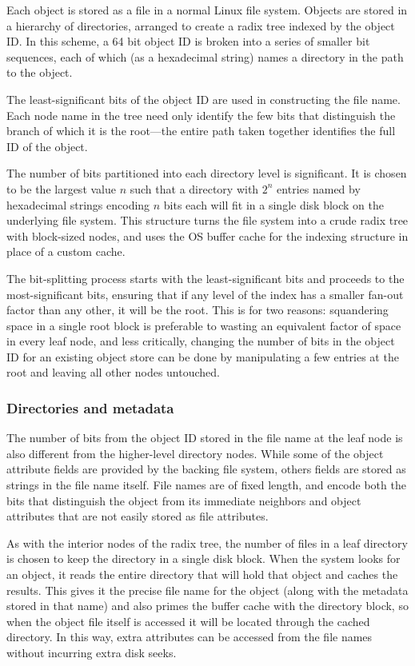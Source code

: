 Each object is stored as a file in a normal Linux file system. Objects are stored in a hierarchy of directories, arranged to create a radix tree indexed by the object ID. In this scheme, a 64 bit object ID is broken into a series of smaller bit sequences, each of which (as a hexadecimal string) names a directory in the path to the object.

The least-significant bits of the object ID are used in constructing the file name. Each node name in the tree need only identify the few bits that distinguish the branch of which it is the root---the entire path taken together identifies the full ID of the object.

The number of bits partitioned into each directory level is significant. It is chosen to be the largest value $n$ such that a directory with $2^n$ entries named by hexadecimal strings encoding $n$ bits each will fit in a single disk block on the underlying file system. This structure turns the file system into a crude radix tree with block-sized nodes, and uses the OS buffer cache for the indexing structure in place of a custom cache.

The bit-splitting process starts with the least-significant bits and proceeds to the most-significant bits, ensuring that if any level of the index has a smaller fan-out factor than any other, it will be the root. This is for two reasons: squandering space in a single root block is preferable to wasting an equivalent factor of space in every leaf node, and less critically, changing the number of bits in the object ID for an existing object store can be done by manipulating a few entries at the root and leaving all other nodes untouched.

\subsubsection{Directories and metadata}

The number of bits from the object ID stored in the file name at the leaf node is also different from the higher-level directory nodes. While some of the object attribute fields are provided by the backing file system, others fields are stored as strings in the file name itself. File names are of fixed length, and encode both the bits that distinguish the object from its immediate neighbors and object attributes that are not easily stored as file attributes.

As with the interior nodes of the radix tree, the number of files in a leaf directory is chosen to keep the directory in a single disk block. When the system looks for an object, it reads the entire directory that will hold that object and caches the results. This gives it the precise file name for the object (along with the metadata stored in that name) and also primes the buffer cache with the directory block, so when the object file itself is accessed it will be located through the cached directory. In this way, extra attributes can be accessed from the file names without incurring extra disk seeks.

